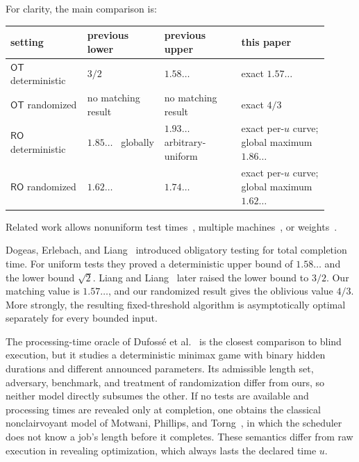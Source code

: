 For clarity, the main comparison is:
\begin{center}
\small
\renewcommand{\arraystretch}{1.12}
\begin{tabular}{@{}L{0.22\linewidth}L{0.22\linewidth}L{0.22\linewidth}L{0.25\linewidth}@{}}
\toprule
setting & previous lower & previous upper & this paper \\
\midrule
$\mathsf{OT}$ deterministic
 & $3/2$~\cite{LiangLiang2026}
 & $1.58\ldots$~\cite{DogeasErlebachLiang2024}
 & exact $1.57\ldots$ \\
$\mathsf{OT}$ randomized
 & no matching result & no matching result & exact $4/3$ \\
$\mathsf{RO}$ deterministic
 & $1.85\ldots$~\cite{DurrErlebachMegowMeissner2020} globally
 & $1.93\ldots$~\cite{DurrErlebachMegowMeissner2020} arbitrary-uniform
 & exact per-$u$ curve;
   global maximum $1.86\ldots$ \\
$\mathsf{RO}$ randomized
 & $1.62\ldots$~\cite{DurrErlebachMegowMeissner2020}
 & $1.74\ldots$~\cite{DurrErlebachMegowMeissner2020}
 & exact per-$u$ curve;
   global maximum $1.62\ldots$ \\
\bottomrule
\end{tabular}
\end{center}
Related work allows nonuniform test
times~\cite{AlbersEckl2021,LiuLiuWongZhang2023,KrekelbergEtAl2026}, multiple
machines~\cite{GongChenHayashi2024}, or weights~\cite{BuldSchulz2026}.

Dogeas, Erlebach, and Liang~\cite{DogeasErlebachLiang2024} introduced
obligatory testing for total completion time.  For uniform tests they proved
a deterministic upper bound of $1.58\ldots$ and the lower bound
$\sqrt2$.  Liang and Liang~\cite{LiangLiang2026} later raised the lower bound
to $3/2$.  Our matching value is $1.57\ldots$, and our randomized
result gives the oblivious value $4/3$.  More strongly, the resulting
fixed-threshold algorithm is asymptotically optimal separately for every
bounded input.

The processing-time oracle of Dufoss{\'e} et
al.~\cite{DufosseEtAl2022} is the closest comparison to blind execution, but
it studies a deterministic minimax game with binary hidden durations and
different announced parameters.  Its admissible length set, adversary,
benchmark, and treatment of randomization differ from ours, so neither model
directly subsumes the other.  If
no tests are available and processing times are revealed only at completion,
one obtains the classical nonclairvoyant model of Motwani, Phillips, and
Torng~\cite{MotwaniPhillipsTorng1994}, in which the scheduler does not know a
job's length before it completes.  These semantics differ from raw
execution in revealing optimization, which always lasts the declared time
$u$.

